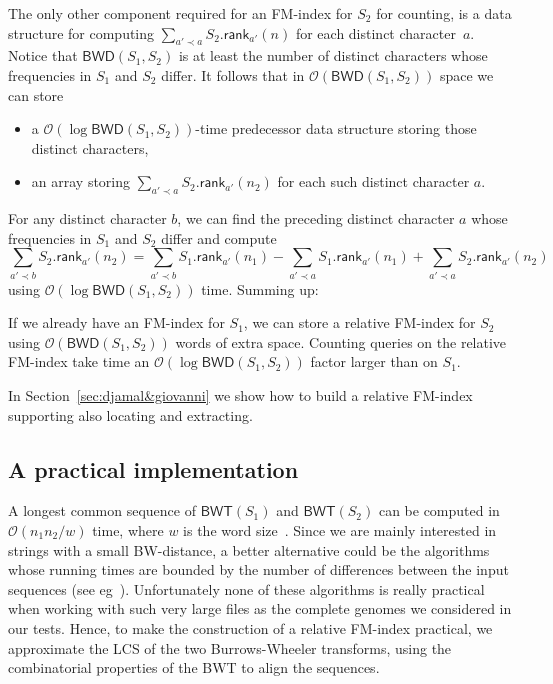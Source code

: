 \documentclass{llncs}
\newcommand{\Oh}[1]
  {\ensuremath{\mathcal{O}\!\left( {#1} \right)}}
\newcommand{\BWD}
  {\ensuremath{\mathsf{BWD}}}
\newcommand{\BWT}
  {\ensuremath{\mathsf{BWT}}}
\newcommand{\rank}
  {\ensuremath{\mathsf{rank}}}
\begin{document}
The only other component required for an FM-index for $S_2$ for counting, is a data
structure for computing  \(\sum_{a' \prec a} S_2.\rank_{a'} (n)\) for each
distinct character~$a$. Notice that \(\BWD (S_1, S_2)\) is at least the
number of distinct characters whose frequencies in $S_1$ and $S_2$ differ. It
follows that in $\Oh{\BWD (S_1, S_2)}$ space we can store
\begin{itemize}
\item a $\Oh{\log \BWD (S_1, S_2)}$-time predecessor data structure
    storing those distinct characters,
\item an array storing \(\sum_{a' \prec a} S_2.\rank_{a'} (n_2)\) for
    each such distinct character $a$.
\end{itemize}
For any distinct character $b$, we can find the preceding distinct character
$a$ whose frequencies in $S_1$ and $S_2$ differ and compute
\[\sum_{a' \prec b} S_2.\rank_{a'} (n_2) = \sum_{a' \prec b} S_1.\rank_{a'} (n_1) - \sum_{a' \prec a} S_1.\rank_{a'} (n_1) + \sum_{a' \prec a} S_2.\rank_{a'} (n_2)\]
using $\Oh{\log \BWD (S_1, S_2)}$ time. Summing up:

\begin{theorem} \label{theo:counting}
If we already have an FM-index for $S_1$, we can store a relative FM-index
for $S_2$ using $\Oh{\BWD (S_1, S_2)}$ words of extra space. Counting queries
on the relative FM-index take time an $\Oh{\log \BWD (S_1, S_2)}$ factor
larger than on $S_1$.
\end{theorem}


In Section~\ref{sec:djamal&giovanni} we show how to build a relative FM-index
supporting also locating and extracting.





\subsection{A practical implementation} \label{sec:simon&jouni}

A longest common sequence of $\BWT (S_1)$ and $\BWT (S_2)$ can be computed in
$\Oh{n_1 n_2 /w}$ time, where $w$ is the word size~\cite{Myers99}. Since we
are mainly interested in strings with a small BW-distance, a better
alternative could be the algorithms whose running times are bounded by the
number of differences between the input sequences (see
eg~\cite{LandauVN86,Myers86}). Unfortunately none of these algorithms is
really practical when working with such very large files as the complete
genomes we considered in our tests. Hence, to make the construction of a
relative FM-index practical, we approximate the LCS of the two
Burrows-Wheeler transforms, using the combinatorial properties of the BWT to
align the sequences.
\end{document}
